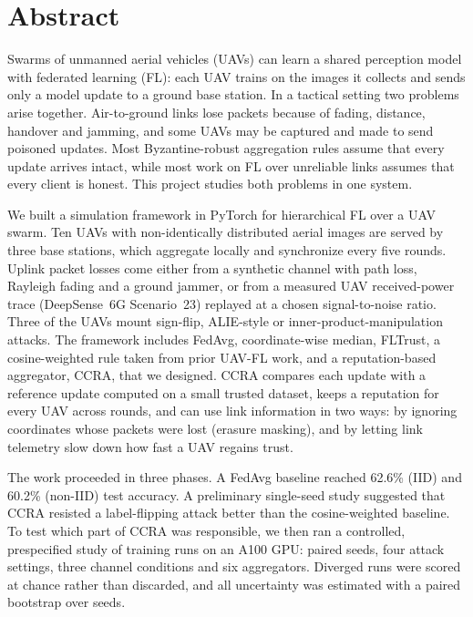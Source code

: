 \chapter*{Abstract}

Swarms of unmanned aerial vehicles (UAVs) can learn a shared perception model with
federated learning (FL): each UAV trains on the images it collects and sends only a
model update to a ground base station. In a tactical setting two problems arise
together. Air-to-ground links lose packets because of fading, distance, handover and
jamming, and some UAVs may be captured and made to send poisoned updates. Most
Byzantine-robust aggregation rules assume that every update arrives intact, while
most work on FL over unreliable links assumes that every client is honest. This
project studies both problems in one system.

We built a simulation framework in PyTorch for hierarchical FL over a UAV swarm. Ten
UAVs with non-identically distributed aerial images are served by three base
stations, which aggregate locally and synchronize every five rounds. Uplink packet
losses come either from a synthetic channel with path loss, Rayleigh fading and a
ground jammer, or from a measured UAV received-power trace (DeepSense~6G Scenario~23)
replayed at a chosen signal-to-noise ratio. Three of the UAVs mount sign-flip,
ALIE-style or inner-product-manipulation attacks. The framework includes FedAvg,
coordinate-wise median, FLTrust, a cosine-weighted rule taken from prior UAV-FL
work, and a reputation-based aggregator, CCRA, that we designed. CCRA compares each
update with a reference update computed on a small trusted dataset, keeps a
reputation for every UAV across rounds, and can use link information in two ways:
by ignoring coordinates whose packets were lost (erasure masking), and by letting
link telemetry slow down how fast a UAV regains trust.

The work proceeded in three phases. A FedAvg baseline reached
62.6\% (IID) and 60.2\% (non-IID) test accuracy. A preliminary single-seed study
suggested that CCRA resisted a label-flipping attack better than the cosine-weighted
baseline. To test which part of CCRA was responsible, we then ran a controlled,
prespecified study of \NumRuns{} training runs on an A100 GPU: \NumSeeds{} paired
seeds, four attack settings, three channel conditions and six aggregators. Diverged
runs were scored at chance rather than discarded, and all uncertainty was estimated
with a paired bootstrap over seeds.

